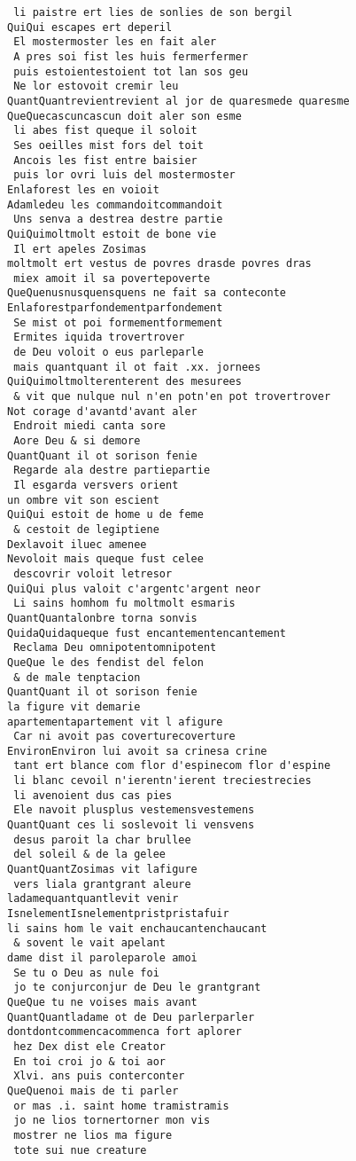 \documentclass[
  letterpaper,
  DIV=11,
  numbers=noendperiod]{scrreprt}
\begin{document}
\begin{verbatim}
 li paistre ert lies de sonlies de son bergil
QuiQui escapes ert deperil
 El mostermoster les en fait aler
 A pres soi fist les huis fermerfermer
 puis estoientestoient tot lan sos geu
 Ne lor estovoit cremir leu
QuantQuantrevientrevient al jor de quaresmede quaresme
QueQuecascuncascun doit aler son esme
 li abes fist queque il soloit
 Ses oeilles mist fors del toit
 Ancois les fist entre baisier
 puis lor ovri luis del mostermoster
Enlaforest les en voioit
Adamledeu les commandoitcommandoit
 Uns senva a destrea destre partie
QuiQuimoltmolt estoit de bone vie
 Il ert apeles Zosimas
moltmolt ert vestus de povres drasde povres dras
 miex amoit il sa povertepoverte
QueQuenusnusquensquens ne fait sa conteconte
Enlaforestparfondementparfondement
 Se mist ot poi formementformement
 Ermites iquida trovertrover
 de Deu voloit o eus parleparle
 mais quantquant il ot fait .xx. jornees
QuiQuimoltmolterenterent des mesurees
 & vit que nulque nul n'en potn'en pot trovertrover
Not corage d'avantd'avant aler
 Endroit miedi canta sore
 Aore Deu & si demore
QuantQuant il ot sorison fenie
 Regarde ala destre partiepartie
 Il esgarda versvers orient
un ombre vit son escient
QuiQui estoit de home u de feme
 & cestoit de legiptiene
Dexlavoit iluec amenee
Nevoloit mais queque fust celee
 descovrir voloit letresor
QuiQui plus valoit c'argentc'argent neor
 Li sains homhom fu moltmolt esmaris
QuantQuantalonbre torna sonvis
QuidaQuidaqueque fust encantementencantement
 Reclama Deu omnipotentomnipotent
QueQue le des fendist del felon
 & de male tenptacion
QuantQuant il ot sorison fenie
la figure vit demarie
apartementapartement vit l afigure
 Car ni avoit pas coverturecoverture
EnvironEnviron lui avoit sa crinesa crine
 tant ert blance com flor d'espinecom flor d'espine
 li blanc cevoil n'ierentn'ierent treciestrecies
 li avenoient dus cas pies
 Ele navoit plusplus vestemensvestemens
QuantQuant ces li soslevoit li vensvens
 desus paroit la char brullee
 del soleil & de la gelee
QuantQuantZosimas vit lafigure
 vers liala grantgrant aleure
ladamequantquantlevit venir
IsnelementIsnelementpristpristafuir
li sains hom le vait enchaucantenchaucant
 & sovent le vait apelant
dame dist il paroleparole amoi
 Se tu o Deu as nule foi
 jo te conjurconjur de Deu le grantgrant
QueQue tu ne voises mais avant
QuantQuantladame ot de Deu parlerparler
dontdontcommencacommenca fort aplorer
 hez Dex dist ele Creator
 En toi croi jo & toi aor
 Xlvi. ans puis conterconter
QueQuenoi mais de ti parler
 or mas .i. saint home tramistramis
 jo ne lios tornertorner mon vis
 mostrer ne lios ma figure
 tote sui nue creature

\end{verbatim}
\end{document}

